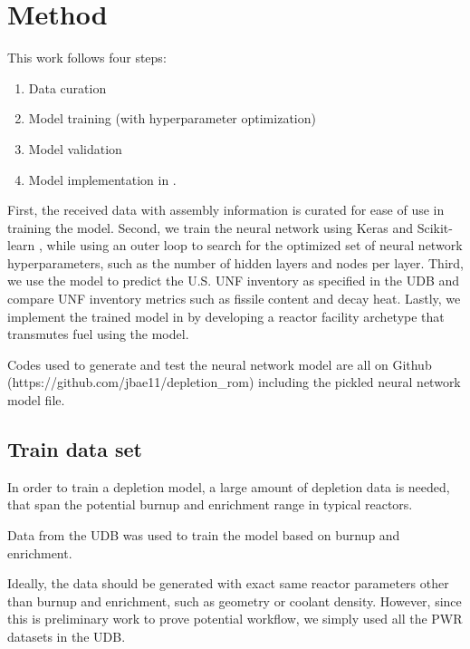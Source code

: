 \section{Method}

This work follows four steps:
\begin{enumerate}
\item Data curation
\item Model training (with hyperparameter optimization)
\item Model validation
\item Model implementation in \Cyclus.
\end{enumerate}
First, the
received data with assembly information is
curated for ease of use in training the model.
Second, we train the neural network using Keras \cite{collet_keras_2015}
and Scikit-learn \cite{pedregosa_scikit-learn_2011},
while using an outer loop to
search for the optimized set of neural network hyperparameters,
such as the number of hidden layers and nodes per layer.
Third, we use the model to predict the U.S. \gls{UNF}
inventory as specified in the \gls{UDB} and compare
\gls{UNF} inventory metrics such as fissile content
and decay heat. Lastly, we implement the trained
model in \Cyclus by developing a reactor facility archetype
that transmutes fuel using the model.

Codes used to generate and test the neural network
model are all on Github (https://github.com/jbae11/depletion\_rom)
including the pickled neural network model file.

\subsection{Train data set}

In order to train a depletion model, a large amount of
depletion data is needed, that span the potential
burnup and enrichment range in typical reactors.

Data from the \gls{UDB} was used to train the model 
based on burnup and enrichment. 

Ideally, the data should be generated with exact same reactor
parameters other than burnup and enrichment, such as geometry or
coolant density. However, since
this is preliminary work to prove potential workflow, we
simply used all the \gls{PWR} datasets in the \gls{UDB}.


